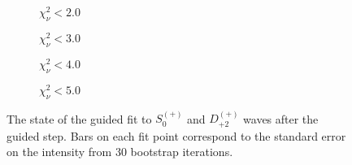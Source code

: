 \begin{figure}[htbp]
    \centering
    \begin{subfigure}{0.45\textwidth}
        
        \caption{$\chi^2_\nu < 2.0$}
    \end{subfigure}
    \hfill
    \begin{subfigure}{0.45\textwidth}
        
        \caption{$\chi^2_\nu < 3.0$}
    \end{subfigure}
    \vspace{1em}
    \begin{subfigure}{0.45\textwidth}
        
        \caption{$\chi^2_\nu < 4.0$}
    \end{subfigure}
    \hfill
    \begin{subfigure}{0.45\textwidth}
        
        \caption{$\chi^2_\nu < 5.0$}
    \end{subfigure}

    \caption{The state of the guided fit to $S_{0}^{(+)}$ and $D_{+2}^{(+)}$ waves after the guided step. Bars on each fit point correspond to the standard error on the intensity from $ 30 $ bootstrap iterations.}
    \label{fig:guided-fit-all-Sp-D2p}
\end{figure}

